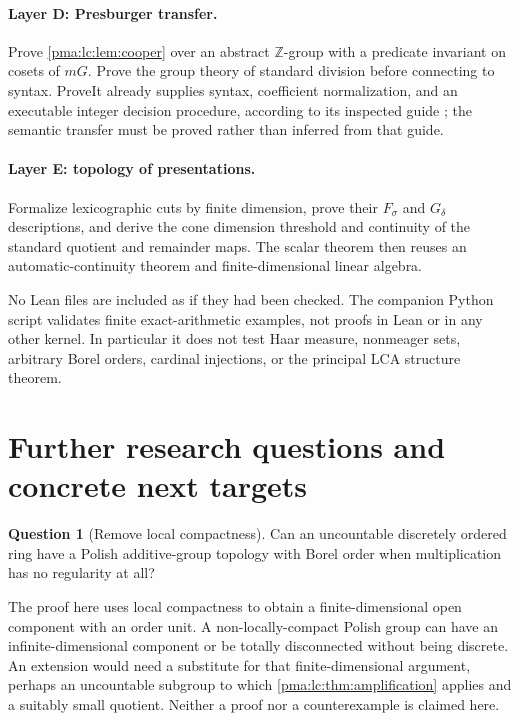 \documentclass[11pt]{article}
\numberwithin{equation}{section}
\theoremstyle{definition}
\newtheorem{question}[question]{Question}
\theoremstyle{remark}
\newcommand{\Z}{\mathbb Z}
\begin{document}
\paragraph{Layer D: Presburger transfer.}
Prove \cref{pma:lc:lem:cooper} over an abstract $\Z$-group with a predicate
invariant on cosets of $mG$. Prove the group theory of standard division
before connecting to syntax. ProveIt already supplies syntax, coefficient
normalization, and an executable integer decision procedure, according
to its inspected guide \cite{s08:RepoPres}; the semantic transfer must
be proved rather than inferred from that guide.

\paragraph{Layer E: topology of presentations.}
Formalize lexicographic cuts by finite dimension, prove their
$F_\sigma$ and $G_\delta$ descriptions, and derive the cone dimension
threshold and continuity of the standard quotient and remainder maps.
The scalar theorem then reuses an automatic-continuity theorem and
finite-dimensional linear algebra.

No Lean files are included as if they had been checked. The companion
Python script validates finite exact-arithmetic examples, not proofs
in Lean or in any other kernel. In particular it does not test Haar
measure, nonmeager sets, arbitrary Borel orders, cardinal injections,
or the principal LCA structure theorem.

\section{Further research questions and concrete next targets}
\label{pma:lc:sec:questions}

\begin{question}[Remove local compactness]\label{pma:lc:q:removelc}
Can an uncountable discretely ordered ring have a Polish additive-group
topology with Borel order when multiplication has no regularity at all?
\end{question}
The proof here uses local compactness to obtain a finite-dimensional
open component with an order unit. A non-locally-compact Polish group
can have an infinite-dimensional component or be totally disconnected
without being discrete. An extension would need a substitute for that
finite-dimensional argument, perhaps an uncountable subgroup to which
\cref{pma:lc:thm:amplification} applies and a suitably small quotient. Neither
a proof nor a counterexample is claimed here.
\end{document}
